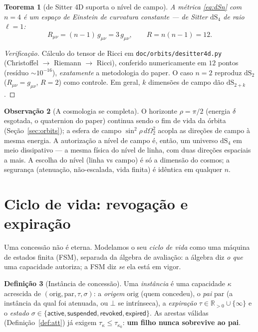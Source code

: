 \documentclass[11pt,a4paper]{article}
\newtheorem{theorem}{Teorema}
\theoremstyle{definition}
\newtheorem{definition}[theorem]{Definição}
\newtheorem{remark}[theorem]{Observação}
\newcommand{\dep}{\delta}
\newcommand{\dS}{\mathrm{dS}}
\begin{document}
  \begin{theorem}[de Sitter 4D suporta o nível de campo]\label{thm:dS4}
  A métrica \eqref{eq:dSn} com $n=4$ é um espaço de Einstein de curvatura
  constante --- de Sitter $\dS_4$ de raio $\ell=1$:
  \[
    R_{\mu\nu}=(n-1)\,g_{\mu\nu}=3\,g_{\mu\nu},\qquad R=n(n-1)=12.
  \]
  \end{theorem}
  \begin{proof}[Verificação]
  Cálculo do tensor de Ricci em \texttt{doc/orbits/desitter4d.py} (Christoffel
  $\to$ Riemann $\to$ Ricci), conferido numericamente em $12$ pontos (resíduo
  $\sim10^{-16}$), \emph{exatamente} a metodologia do paper. O caso $n=2$
  reproduz $\dS_2$ ($R_{\mu\nu}=g_{\mu\nu}$, $R=2$) como controle. Em geral,
  $k$ dimensões de campo dão $\dS_{2+k}$.
  \end{proof}

  \begin{remark}[A cosmologia se completa]
  O horizonte $\rho=\pi/2$ (energia $\dep$ esgotada, o quaternion do paper)
  continua sendo o fim de vida da órbita (Seção~\ref{sec:orbits}); a esfera de
  campo $\sin^2\!\rho\,d\Omega^2_2$ acopla as direções de campo à mesma energia.
  A autorização a nível de campo é, então, um universo $\dS_4$ em meio
  dissipativo --- a mesma física do nível de linha, com duas direções
  espaciais a mais. A escolha do nível (linha vs campo) é só a dimensão do
  cosmos; a segurança (atenuação, não-escalada, vida finita) é idêntica em
  qualquer $n$.
  \end{remark}

  \section{Ciclo de vida: revogação e expiração}\label{sec:lifecycle}

  Uma concessão não é eterna. Modelamos o seu \emph{ciclo de vida} como uma
  máquina de estados finita (FSM), separada da álgebra de avaliação: a álgebra
  diz \emph{o que} uma capacidade autoriza; a FSM diz \emph{se} ela está em
  vigor.

  \begin{definition}[Instância de concessão]
  Uma \emph{instância} é uma capacidade $\kappa$ acrescida de
  $(\mathrm{orig},\mathrm{par},\tau,\sigma)$: a \emph{origem} $\mathrm{orig}$
  (quem concedeu), o \emph{pai} $\mathrm{par}$ (a instância da qual foi
  atenuada, ou $\bot$ se intrínseca), a \emph{expiração}
  $\tau\in\mathbb{R}_{>0}\cup\{\infty\}$ e o \emph{estado}
  $\sigma\in\{\textsf{active},\textsf{suspended},\textsf{revoked},
  \textsf{expired}\}$. As arestas válidas (Definição~\ref{def:att}) já exigem
  $\tau_\kappa\le\tau_{\kappa_0}$: \textbf{um filho nunca sobrevive ao pai}.
  \end{definition}
\end{document}
